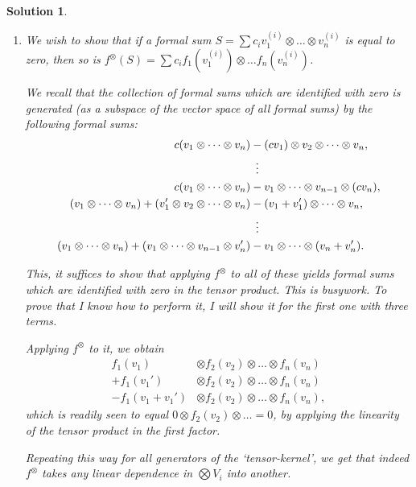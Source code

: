 \documentclass{article}
\theoremstyle{nonumberplain}
\newtheorem{sol}{Solution}
\begin{document}
\begin{sol}\leavevmode
\begin{enumerate}
\item We wish to show that if a formal sum $S = \sum c_i v_1^{(i)} \otimes \dots \otimes v_n^{(i)}$ is equal to zero, then so is $f^\otimes(S) = \sum c_i f_1(v_1^{(i)}) \otimes \dots f_n(v_n^{(i)})$.

We recall that the collection of formal sums which are identified with zero is generated (as a subspace of the vector space of all formal sums) by the following formal sums:
\begin{equation}
\begin{aligned}
c (v_1 \otimes \dots \otimes v_n) &- (c v_1) \otimes v_2 \otimes \dots \otimes v_n,\\
&\vdotswithin{-}\\
c (v_1 \otimes \dots \otimes v_n) &- v_1 \otimes \dots \otimes v_{n-1} \otimes (c v_n),\\
(v_1 \otimes \dots \otimes v_n) + (v_1' \otimes v_2 \otimes \dots \otimes v_n) &- (v_1+v_1') \otimes \dots \otimes v_n,\\
&\vdotswithin{-}\\
(v_1 \otimes \dots \otimes v_n) + (v_1 \otimes \dots \otimes v_{n-1} \otimes v_n') &- v_1 \otimes \dots \otimes (v_n + v_n').
\end{aligned}
\end{equation}

This, it suffices to show that applying $f^\otimes$ to all of these yields formal sums which are identified with zero in the tensor product. This is busywork. To prove that I know how to perform it, I will show it for the first one with three terms.

Applying $f^\otimes$ to it, we obtain
\begin{equation}
\begin{aligned}
f_1(v_1) &\otimes f_2(v_2) \otimes \dots \otimes f_n(v_n)\\
+ f_1(v_1') &\otimes f_2(v_2) \otimes \dots \otimes f_n(v_n)\\
- f_1(v_1+v_1') &\otimes f_2(v_2) \otimes \dots \otimes f_n(v_n),
\end{aligned}
\end{equation}
which is readily seen to equal $0 \otimes f_2(v_2) \otimes \dots = 0$, by applying the linearity of the tensor product in the first factor.

Repeating this way for all generators of the `tensor-kernel', we get that indeed $f^\otimes$ takes any linear dependence in $\bigotimes V_i$ into another.


\end{enumerate}
\end{sol}
\end{document}
